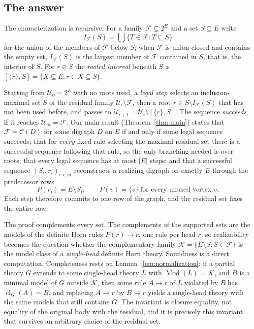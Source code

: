 \documentclass[11pt,a4paper]{article}
\theoremstyle{plain}
\theoremstyle{definition}
\theoremstyle{remark}
\newcommand{\cC}{\mathcal C}
\newcommand{\cF}{\mathcal F}
\newcommand{\cK}{\mathcal K}
\newcommand{\cU}{\mathcal U}
\newcommand{\Mod}{\operatorname{Mod}}
\newcommand{\cl}{\operatorname{cl}}
\newcommand{\Int}{I_{\cF}}
\newcommand{\ivl}[2]{[\{#1\},#2]}
\newcommand{\pw}[1]{2^{#1}}
\begin{document}
\subsection{The answer}

The characterization is recursive. For a family $\cF\subseteq\pw{E}$ and a set $S\subseteq E$ write
\begin{equation}\label{eq:interior}
 \Int(S)=\bigcup\{T\in\cF: T\subseteq S\}
\end{equation}
for the union of the members of $\cF$ below $S$; when $\cF$ is union-closed and contains the empty set, $\Int(S)$ is the largest member of $\cF$ contained in $S$, that is, the interior of $S$. For $r\in S$ the \emph{rooted interval} beneath $S$ is $\ivl{r}{S}=\{X\subseteq E: r\in X\subseteq S\}$.

Starting from $\cU_0=\pw{E}$ with no roots used, a \emph{legal step} selects an inclusion-maximal set $S$ of the residual family $\cU_i\setminus\cF$, then a root $r\in S\setminus\Int(S)$ that has not been used before, and passes to $\cU_{i+1}=\cU_i\setminus\ivl{r}{S}$. The sequence \emph{succeeds} if it reaches $\cU_m=\cF$. Our main result (Theorem~\ref{thm:main}) states that $\cF=\cC(D)$ for some digraph $D$ on $E$ if and only if some legal sequence succeeds; that for \emph{every} fixed rule selecting the maximal residual set there is a successful sequence following that rule, so the only branching needed is over roots; that every legal sequence has at most $|E|$ steps; and that a successful sequence $(S_i,r_i)_{i<m}$ reconstructs a realizing digraph on exactly $E$ through the predecessor rows
\[
 P(r_i)=E\setminus S_i,\qquad P(v)=\{v\}\ \text{for every unused vertex }v .
\]
Each step therefore commits to one row of the graph, and the residual set fixes the entire row.

The proof complements every set. The complements of the supported sets are the models of the definite Horn rules $P(r)\to r$, one rule per head $r$, so realizability becomes the question whether the complementary family $\cK=\{E\setminus S:S\in\cF\}$ is the model class of a \emph{single-head} definite Horn theory. Soundness is a direct computation. Completeness rests on Lemma~\ref{lem:normalization}: if a partial theory $G$ extends to some single-head theory $L$ with $\Mod(L)=\cK$, and $B$ is a minimal model of $G$ outside $\cK$, then some rule $A\to r$ of $L$ violated by $B$ has $\cl_G(A)=B$, and replacing $A\to r$ by $B\to r$ yields a single-head theory with the same models that still contains $G$. The invariant is closure equality, not equality of the original body with the residual, and it is precisely this invariant that survives an arbitrary choice of the residual set.
\end{document}
